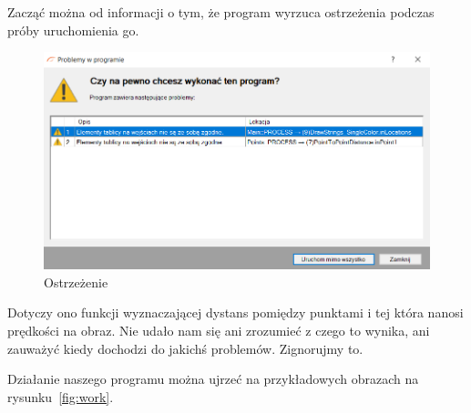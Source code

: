 \documentclass[11pt, a4paper]{article}
\begin{document}
Zacząć można od informacji o tym, że program wyrzuca ostrzeżenia podczas próby uruchomienia go.
\begin{figure}[htbp!]
	\centering
	\includegraphics[width = 0.75 \linewidth]{img2}
	\caption{Ostrzeżenie}
	\label{fig:warning}
\end{figure}

Dotyczy ono funkcji wyznaczającej dystans pomiędzy punktami i tej która nanosi prędkości na obraz. Nie udało nam się ani zrozumieć z czego to wynika, ani zauważyć kiedy dochodzi do jakichś problemów. Zignorujmy to.

Działanie naszego programu można ujrzeć na przykładowych obrazach na rysunku~\ref{fig:work}.

\newcommand{\W}{0.32}
\end{document}
